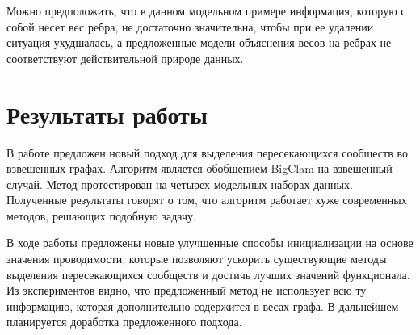\documentclass{ITaSconf}
\begin{document}
	Можно предположить, что в данном модельном примере информация, которую с собой несет вес ребра, не достаточно значительна, чтобы при ее удалении ситуация ухудшалась, а предложенные модели объяснения весов на ребрах не соответствуют действительной природе данных.
	
	\section{Результаты работы}
	
	В работе предложен новый подход для выделения пересекающихся сообществ во взвешенных графах. 
	Алгоритм является обобщением BigClam на взвешенный случай.
	Метод протестирован на четырех модельных наборах данных. 
	Полученные результаты говорят о том, что алгоритм работает хуже современных методов, решающих подобную задачу. 
	
	В ходе работы предложены новые улучшенные способы инициализации на основе значения проводимости, которые позволяют ускорить существующие методы выделения пересекающихся сообществ и достичь лучших значений функционала.
	Из экспериментов видно, что предложенный метод не использует всю ту информацию, которая дополнительно содержится в весах графа. 
	В дальнейшем планируется доработка предложенного подхода.
	
	
	
	
\end{document}
